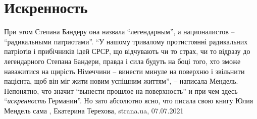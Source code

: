  
 
 
 
 
\chapter{Искренность}
\label{sec:slova.iskrennost}

При этом Степана Бандеру она назвала \enquote{легендарным}, а националистов –
\enquote{радикальными патриотами}.  \enquote{У нашому тривалому протистоянні
радикальних патріотів і прибічників ідей СРСР, що відчувають чи то страх, чи то
відразу до легендарного Степана Бандери, правда і сила будуть на боці того, хто
зможе наважитися на щирість Німеччини – винести минуле на поверхню і звільнити
пацієнта, щоб він міг жити новим успішним життям}, – написала Мендель.
Непонятно, что значит \enquote{вынести прошлое на поверхность} и при чем здесь
\enquote{\emph{искренность} Германии}. Но зато абсолютно ясно, что писала свою
книгу Юлия Мендель сама
, 
Екатерина Терехова, strana.ua, 07.07.2021

